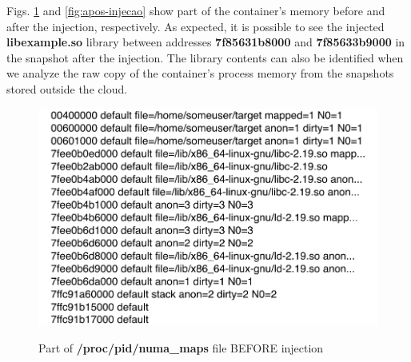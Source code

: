 \documentclass[10pt,journal,compsoc]{IEEEtran}
\newcommand{\fancyname}{Dizang}
\begin{document}
%
Figs. \ref{fig:antes-injecao} and \ref{fig:apos-injecao} show part of the container's memory before and after the injection, respectively.
%
As expected, it is possible to see the injected \textbf{libexample.so} library between addresses \textbf{7f85631b8000} and \textbf{7f85633b9000} in the snapshot after the injection.
%
The library contents can also be identified when we analyze the raw copy of the container's process memory from the snapshots stored outside the cloud.

%
%

\begin{figure}[htb!]
\footnotesize
\caption{Part of \textbf{/proc/pid/numa\_maps} file BEFORE injection }
\includegraphics[scale=0.60]{antes-injecao.pdf}
\centering
\label{fig:antes-injecao}
\end{figure}
\end{document}
